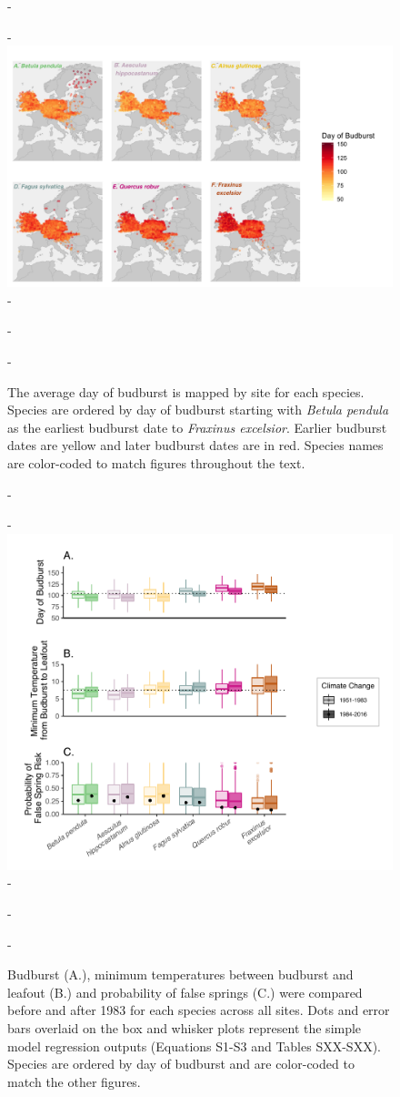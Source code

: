 \documentclass{article}\usepackage[]{graphicx}\usepackage[]{color}
\begin{document}
{\begin{figure} [H]
  -\begin{center}
  -\includegraphics[width=14cm]{..//analyses/figures/BB_base.png}
  -\caption{The average day of budburst is mapped by site for each species. Species are ordered by day of budburst starting with \textit{Betula pendula} as the earliest budburst date to \textit{Fraxinus excelsior}. Earlier budburst dates are yellow and later budburst dates are in red. Species names are color-coded to match figures throughout the text. }\label{fig:bbmap}
  -\end{center}
  -\end{figure}}
  
{\begin{figure} [H]
  -\begin{center}
  -\includegraphics[width=14cm]{..//analyses/figures/Boxplot_BBTminFS_noDots.pdf}
  -\caption{Budburst (A.), minimum temperatures between budburst and leafout (B.) and probability of false springs (C.) were compared before and after 1983 for each species across all sites. Dots and error bars overlaid on the box and whisker plots represent the simple model regression outputs (Equations S1-S3 and Tables SXX-SXX). Species are ordered by day of budburst and are color-coded to match the other figures.  }\label{fig:boxfs}
  -\end{center}
  -\end{figure}}
  
\end{document}
